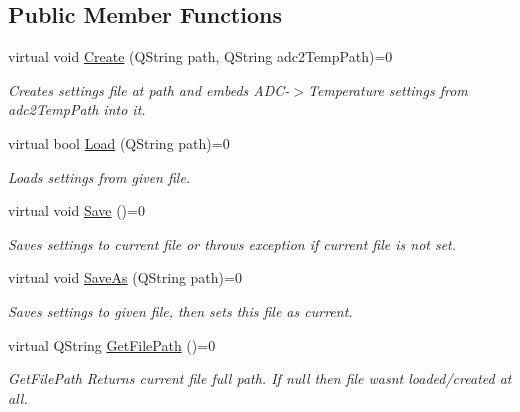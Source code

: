 \subsection*{Public Member Functions}
\begin{DoxyCompactItemize}
\item 
virtual void \hyperlink{class_interfaces_1_1_i_settings_saver_loader_a67e729cc53f53b6bdeb534dc62000531}{Create} (Q\+String path, Q\+String adc2\+Temp\+Path)=0
\begin{DoxyCompactList}\small\item\em Creates settings file at path and embeds A\+D\+C-\/$>$Temperature settings from adc2\+Temp\+Path into it. \end{DoxyCompactList}\item 
virtual bool \hyperlink{class_interfaces_1_1_i_settings_saver_loader_a4d8bdb2c5a27b5b0aa5ee4e55483f0de}{Load} (Q\+String path)=0
\begin{DoxyCompactList}\small\item\em Loads settings from given file. \end{DoxyCompactList}\item 
\mbox{\label{class_interfaces_1_1_i_settings_saver_loader_a5434144e59300dd6ed380f9600870cfa}} 
virtual void \hyperlink{class_interfaces_1_1_i_settings_saver_loader_a5434144e59300dd6ed380f9600870cfa}{Save} ()=0
\begin{DoxyCompactList}\small\item\em Saves settings to current file or throws exception if current file is not set. \end{DoxyCompactList}\item 
virtual void \hyperlink{class_interfaces_1_1_i_settings_saver_loader_a2d6a6dd6e5b6fe15e8b78af2e75725fc}{Save\+As} (Q\+String path)=0
\begin{DoxyCompactList}\small\item\em Saves settings to given file, then sets this file as current. \end{DoxyCompactList}\item 
virtual Q\+String \hyperlink{class_interfaces_1_1_i_settings_saver_loader_a7224c9ffc2d9c6a3b98fb20246e97cc3}{Get\+File\+Path} ()=0
\begin{DoxyCompactList}\small\item\em Get\+File\+Path Returns current file full path. If null then file wasn\textquotesingle{}t loaded/created at all. \end{DoxyCompactList}\item 

\end{DoxyCompactItemize}
